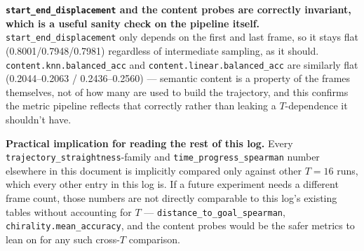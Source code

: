 \textbf{\texttt{start\_end\_displacement} and the content probes are correctly invariant,
which is a useful sanity check on the pipeline itself.} \texttt{start\_end\_displacement}
only depends on the first and last frame, so it stays flat (0.8001/0.7948/0.7981)
regardless of intermediate sampling, as it should. \texttt{content.knn.balanced\_acc} and
\texttt{content.linear.balanced\_acc} are similarly flat (0.2044--0.2063 /
0.2436--0.2560) --- semantic content is a property of the frames themselves, not of how
many are used to build the trajectory, and this confirms the metric pipeline reflects
that correctly rather than leaking a $T$-dependence it shouldn't have.

\textbf{Practical implication for reading the rest of this log.} Every
\texttt{trajectory\_straightness}-family and \texttt{time\_progress\_spearman} number
elsewhere in this document is implicitly compared only against other $T{=}16$ runs,
which every other entry in this log is. If a future experiment needs a different frame
count, those numbers are not directly comparable to this log's existing tables without
accounting for $T$ --- \texttt{distance\_to\_goal\_spearman}, \texttt{chirality.mean\_accuracy},
and the content probes would be the safer metrics to lean on for any such cross-$T$
comparison.
